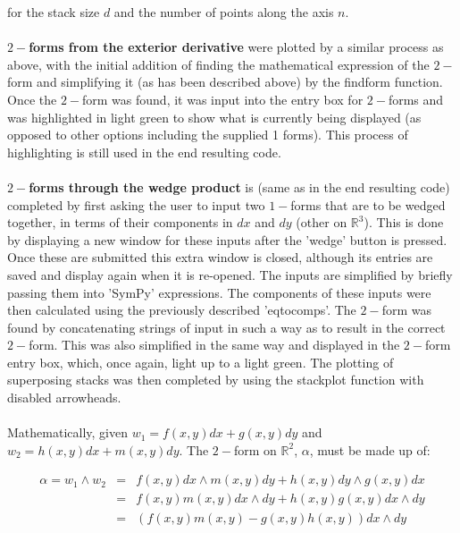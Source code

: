 \documentclass[12pt]{report}
\begin{document}
for the stack size $d$ and the number of points along the axis $n$. \\~\\


\textbf{$2-$forms from the exterior derivative} were plotted by a similar process as above, with the initial addition of finding the mathematical expression of the $2-$form and simplifying it (as has been described above) by the find\textunderscore form function. Once the $2-$form was found, it was input into the entry box for $2-$forms and was highlighted in light green to show what is currently being displayed (as opposed to other options including the supplied 1 forms). This process of highlighting is still used in the end resulting code. \\~\\


\textbf{$2-$forms through the wedge product} is (same as in the end resulting code) completed by first asking the user to input two $1-$forms that are to be wedged together, in terms of their components in $dx$ and $dy$ (other on $\mathbb{R}^{3}$). This is done by displaying a new window for these inputs after the 'wedge' button is pressed. Once these are submitted this extra window is closed, although its entries are saved and display again when it is re-opened. The inputs are simplified by briefly passing them into 'SymPy' expressions. The components of these inputs were then calculated using the previously described 'eq\textunderscore to\textunderscore comps'. The $2-$form was found by concatenating strings of input in such a way as to result in the correct $2-$form. This was also simplified in the same way and displayed in the $2-$form entry box, which, once again, light up to a light green. The plotting of superposing stacks was then completed by using the stack\textunderscore plot function with disabled arrowheads.\\~\\

Mathematically, given $w_{1} = f(x, y) dx + g(x, y) dy$  and $w_{2} = h(x, y) dx + m(x, y) dy$. The $2-$form on $\mathbb{R}^{2}$, $\alpha$, must be made up of:


\begin{eqnarray*}
	\label{T2}
		\alpha = w_{1}\wedge w_{2} &=& f(x, y) dx\wedge m(x, y) dy + h(x, y) dy\wedge g(x, y) dx\\
		&=&f(x, y)m(x, y) dx\wedge dy + h(x, y)g(x, y) dx\wedge dy \\&=& (f(x, y)m(x, y) - g(x, y)h(x, y)) dx\wedge dy  
\end{eqnarray*}
\end{document}
